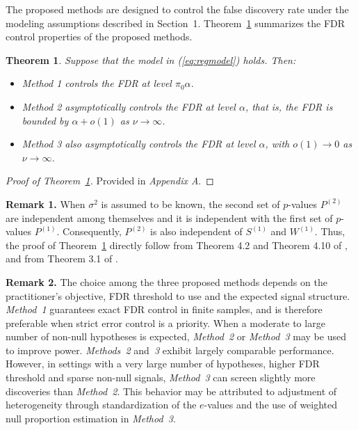 \documentclass[11pt]{article}
\numberwithin{equation}{section}
\theoremstyle{plain}
\newtheorem{theorem}{Theorem}[section]
\theoremstyle{remark}
\begin{document}
The proposed methods are designed to control the false discovery rate under the modeling assumptions described in Section~1. Theorem~\ref{thm:combined_theorem} summarizes the FDR control properties of the proposed methods.

\begin{theorem}
\label{thm:combined_theorem}
Suppose that the model in (\ref{eq:regmodel}) holds. Then:
\begin{itemize}
    \item \textit{Method 1} controls the FDR at level $\pi_0 \alpha$.
    \item \textit{Method 2} asymptotically controls the FDR at level $\alpha$, that is, the FDR is bounded by $\alpha + o(1)$ as $\nu \to \infty$.
    \item \textit{Method 3} also asymptotically controls the FDR at level $\alpha$, with $o(1) \to 0$ as $\nu \to \infty$.
\end{itemize}
\end{theorem}

\begin{proof}[Proof of Theorem~\ref{thm:combined_theorem}]
Provided in \emph{Appendix A}.
\end{proof}

\textbf{Remark 1.} When $\sigma^2$ is assumed to be known, the second set of $p$-values $P^{(2)}$ are independent among themselves and it is independent with the first set of $p$-values $P^{(1)}$. Consequently, $P^{(2)}$ is also independent of $S^{(1)}$ and $W^{(1)}$. Thus, the proof of Theorem~\ref{thm:combined_theorem} directly follow from Theorem 4.2 and Theorem 4.10 of \citet{ignatiadis2024evalues}, and from Theorem 3.1 of \citet{biswas2023new}.

\textbf{Remark 2.} The choice among the three proposed methods depends on the practitioner’s objective, FDR threshold to use and the expected signal structure. \textit{Method~1} guarantees exact FDR control in finite samples, and is therefore preferable when strict error control is a priority. When a moderate to large number of non-null hypotheses is expected, \textit{Method~2} or \textit{Method~3} may be used to improve power. \textit{Methods~2} and\textit{~3} exhibit largely comparable performance. However, in settings with a very large number of hypotheses, higher FDR threshold and sparse non-null signals, \textit{Method~3} can screen slightly more discoveries than \textit{Method~2}. This behavior may be attributed to adjustment of heterogeneity through standardization of the $e$-values and the use of weighted null proportion estimation in \textit{Method~3}.
\end{document}
